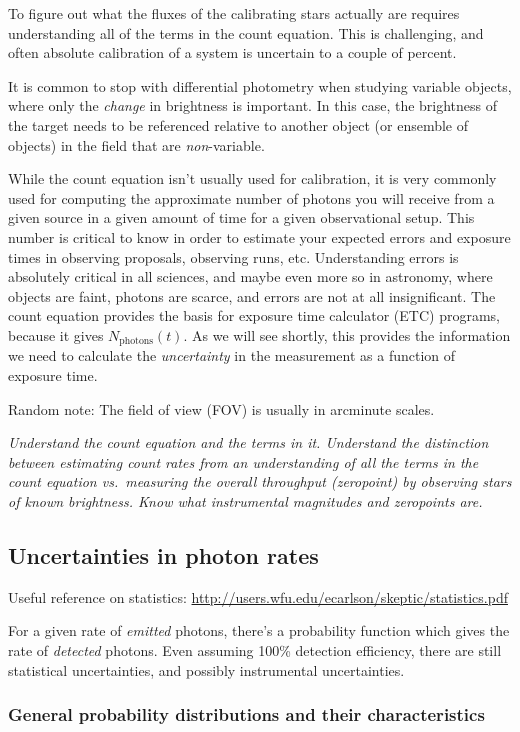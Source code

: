\documentclass[12pt]{article}
\newcommand{\mynotes}[1]{\textcolor{myBlue}{#1}}
\newcommand{\test}[1]{%
    \begin{center}
        {\parbox{0.9\textwidth}{\textit{\small#1}}}
    \end{center}}
\begin{document}
To figure out what the fluxes of the calibrating stars actually are
requires understanding all of the terms in the count equation.
This is challenging, and often absolute calibration of a system is
uncertain to a couple of percent.

It is common to stop with differential photometry when studying variable
objects, where only the \emph{change} in brightness is important. In this case,
the brightness of the target needs to be referenced relative to another object
(or ensemble of objects) in the field that are \emph{non}-variable.

While the count equation isn't usually used for calibration, it is very
commonly used for computing the approximate number of photons you will receive
from a given source in a given amount of time for a given observational setup.
This number is critical to know in order to estimate your expected errors and
exposure times in observing proposals, observing runs, etc. Understanding
errors is absolutely critical in all sciences, and maybe even more so in
astronomy, where objects are faint, photons are scarce, and errors are not at
all insignificant. The count equation provides the basis for exposure time
calculator (ETC) programs, because it gives $N_{\textrm{photons}}(t)$. As we
will see shortly, this provides the information we need to calculate the
\textit{uncertainty} in the measurement as a function of exposure time.

\mynotes{Random note: The field of view (FOV) is usually in arcminute scales.}

\test{Understand the count equation and the terms in it. Understand the
distinction between estimating count rates from an understanding of all the
terms in the count equation vs.\ measuring the overall throughput (zeropoint)
by observing stars of known brightness. Know what instrumental magnitudes and
zeropoints are.}

\subsection{Uncertainties in photon rates}
Useful reference on statistics: \url{http://users.wfu.edu/ecarlson/skeptic/statistics.pdf}

For a given rate of \emph{emitted} photons, there's a probability function
which gives the rate of \emph{detected} photons. Even assuming 100\% detection
efficiency, there are still statistical uncertainties, and possibly
instrumental uncertainties.

\subsubsection{General probability distributions and their characteristics}
\end{document}
